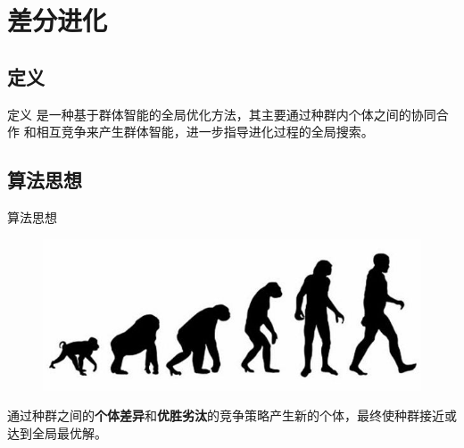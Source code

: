 ﻿%
%

\section{差分进化}

\subsection{定义}
\begin{frame}{定义}
	{}是一种基于群体智能的全局优化方法，其主要通过种群内个体之间的协同合作
		和相互竞争来产生群体智能，进一步指导进化过程的全局搜索。
\end{frame}

\subsection{算法思想}
\begin{frame}{算法思想}
	\begin{figure}
		\includegraphics [width =1.0\textwidth]{../images/evolution.png}
	\end{figure}
	通过种群之间的\textbf{个体差异}和\textbf{优胜劣汰}的竞争策略产生新的个体，最终使种群接近或达到全局最优解。
\end{frame}

